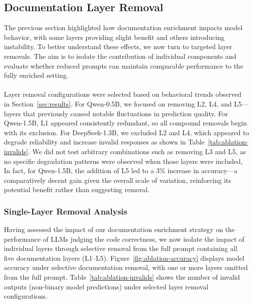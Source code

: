 \documentclass[a4paper]{usiinfbachelorproject}
\begin{document}
\subsection{Documentation Layer Removal}
The previous section highlighted how documentation enrichment impacts model behavior, with some layers providing slight benefit and others introducing instability. To better understand these effects, we now turn to targeted layer removals. The aim is to isolate the contribution of individual components and evaluate whether reduced prompts can maintain comparable performance to the fully enriched setting.\\
\\
Layer removal configurations were selected based on behavioral trends observed in Section~\ref{sec:results}. For Qwen-0.5B, we focused on removing L2, L4, and L5—layers that previously caused notable fluctuations in prediction quality. For Qwen-1.5B, L1 appeared consistently redundant, so all compound removals begin with its exclusion. For DeepSeek-1.3B, we excluded L2 and L4, which appeared to degrade reliability and increase invalid responses as shown in Table~\ref{tab:ablation-invalids}. We did not test arbitrary combinations such as removing L3 and L5, as no specific degradation patterns were observed when those layers were included, In fact, for Qwen-1.5B, the addition of L5 led to a 3\% increase in accuracy—a comparatively decent gain given the overall scale of variation, reinforcing its potential benefit rather than suggesting removal.

\subsubsection{Single-Layer Removal Analysis}
Having assessed the impact of our documentation enrichment strategy on the performance of LLMs judging the code correctness, we now isolate the impact of individual layers through selective removal from the full prompt containing all five documentation layers (L1–L5). Figure~\ref{fig:ablation-accuracy} displays model accuracy under selective documentation removal, with one or more layers omitted from the full prompt. Table~\ref{tab:ablation-invalids} shows the number of invalid outputs (non-binary model predictions) under selected layer removal configurations.
\end{document}
